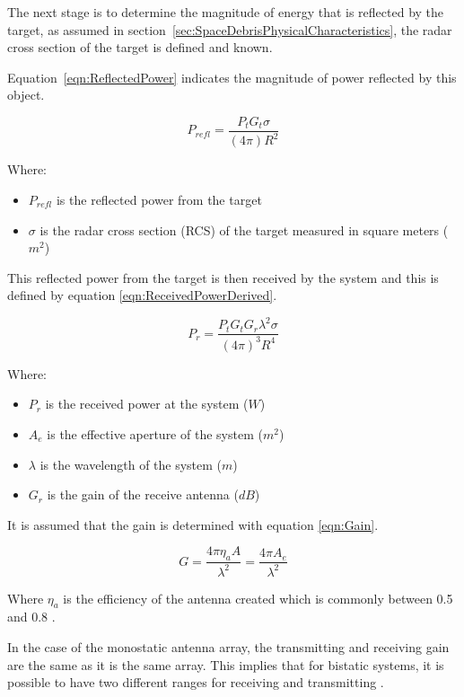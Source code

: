 \documentclass[11pt]{witseiepaper}
\begin{document}
\begin{bibunit}[witseie]
The next stage is to determine the magnitude of energy that is reflected by the target, as assumed in section~\ref{sec:SpaceDebrisPhysicalCharacteristics}, the radar cross section of the target is defined and known. 

Equation~\ref{eqn:ReflectedPower} indicates the magnitude of power reflected by this object.

\begin{equation} \label{eqn:ReflectedPower}
P_{refl} = \frac{P_{t} G_{t} \sigma}{(4 \pi) R^2}
\end{equation}

Where:
\begin{itemize}
    \item $P_{refl}$ is the reflected power from the target
    \item $\sigma$ is the radar cross section (RCS) of the target measured in square meters ($m^2$)
\end{itemize}

This reflected power from the target is then received by the system and this is defined by equation \ref{eqn:ReceivedPowerDerived}.

\begin{equation} \label{eqn:ReceivedPowerDerived}
P_{r} = \frac{P_{t} G_{t} G_{r} \lambda^2 \sigma}{(4 \pi )^3 R^4}
\end{equation}

Where:
\begin{itemize}
    \item $P_{r}$ is the received power at the system ($W$)
    \item $A_{e}$ is the effective aperture of the system ($m^2$)
    \item $\lambda$ is the wavelength of the system ($m$)
    \item $G_{r}$ is the gain of the receive antenna ($dB$)
\end{itemize}

It is assumed that the gain is determined with equation \ref{eqn:Gain}.

\begin{equation} \label{eqn:Gain}
G = \frac{4 \pi \eta_{a} A}{\lambda^2} = \frac{4 \pi A_{e}}{\lambda^2}
\end{equation}

Where $\eta_{a}$ is the efficiency of the antenna created which is commonly between 0.5 and 0.8 \cite[p.~64]{radarHandbook}.

In the case of the monostatic antenna array, the transmitting and receiving gain are the same as it is the same array. This implies that for bistatic systems, it is possible to have two different ranges for receiving and transmitting \cite[p.~64]{radarHandbook}.



\end{bibunit}
\end{document}
